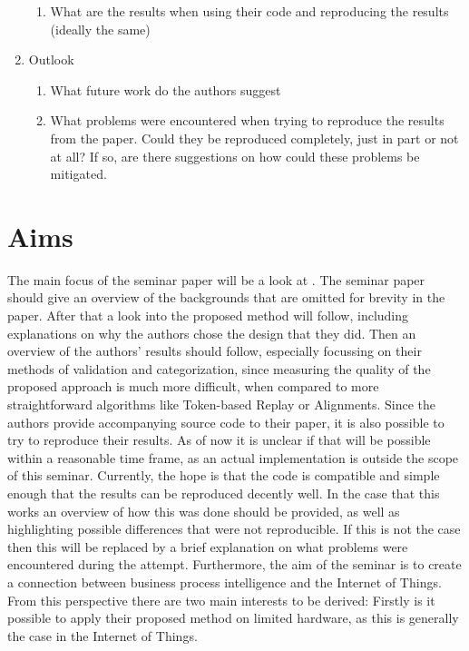 \documentclass[runningheads]{template/llncs}
\begin{document}
\begin{enumerate}
\begin{enumerate}
		\item What are the results when using their code and reproducing the results (ideally the same)
	\end{enumerate}
	\item Outlook
	\begin{enumerate}
		\item What future work do the authors suggest
		\item What problems were encountered when trying to reproduce the results from the paper. Could they be reproduced completely, just in part or not at all? If so, are there suggestions on how could these problems be mitigated.
	\end{enumerate}
\end{enumerate}

\section{Aims}
The main focus of the seminar paper will be a look at \cite{PBWe20}. The seminar paper should give an overview of the backgrounds that are omitted for brevity in the paper.
After that a look into the proposed method will follow, including explanations on why the authors chose the design that they did.
Then an overview of the authors' results should follow, especially focussing on their methods of validation and categorization, since measuring the quality of the proposed approach is much more difficult, when compared to more straightforward algorithms like Token-based Replay or Alignments.
Since the authors provide accompanying source code to their paper, it is also possible to try to reproduce their results.
As of now it is unclear if that will be possible within a reasonable time frame, as an actual implementation is outside the scope of this seminar.
Currently, the hope is that the code is compatible and simple enough that the results can be reproduced decently well.
In the case that this works an overview of how this was done should be provided, as well as highlighting possible differences that were not reproducible.
If this is not the case then this will be replaced by a brief explanation on what problems were encountered during the attempt.
Furthermore, the aim of the seminar is to create a connection between business process intelligence and the Internet of Things. From this perspective there are two main interests to be derived: Firstly is it possible to apply their proposed method on limited hardware, as this is generally the case in the Internet of Things.  %
\end{document}
